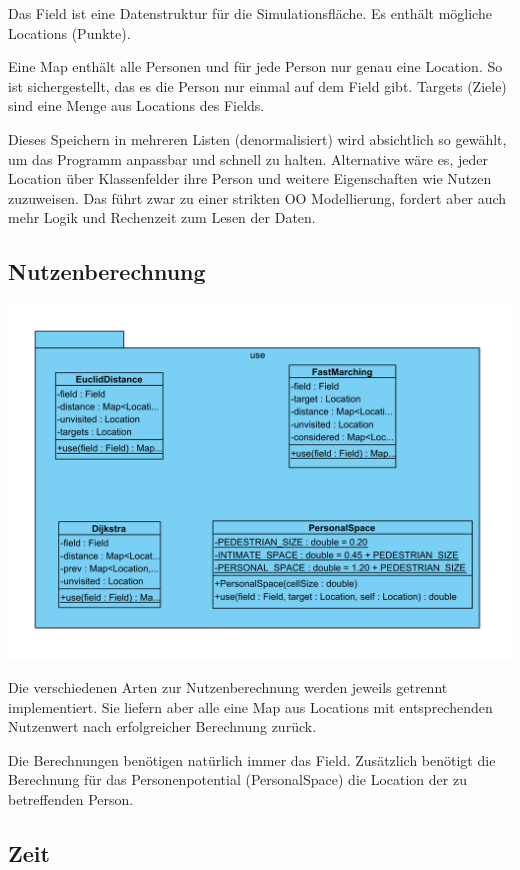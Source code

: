 Das Field ist eine Datenstruktur für die Simulationsfläche. Es enthält mögliche Locations (Punkte).

Eine Map enthält alle Personen und für jede Person nur genau eine Location. So ist sichergestellt, das es die Person nur einmal auf dem Field gibt. Targets (Ziele) sind eine Menge aus Locations des Fields.

Dieses Speichern in mehreren Listen (denormalisiert) wird absichtlich so gewählt, um das Programm anpassbar und schnell zu halten. Alternative wäre es, jeder Location über Klassenfelder ihre Person und weitere Eigenschaften wie Nutzen zuzuweisen. Das führt zwar zu einer strikten OO Modellierung, fordert aber auch mehr Logik und Rechenzeit zum Lesen der Daten.

\subsection{Nutzenberechnung}

\includegraphics[width=\textwidth]{abbildungen/uml/field-use}

Die verschiedenen Arten zur Nutzenberechnung werden jeweils getrennt implementiert. Sie liefern aber alle eine Map aus Locations mit entsprechenden Nutzenwert nach erfolgreicher Berechnung zurück.

Die Berechnungen benötigen natürlich immer das Field. Zusätzlich benötigt die Berechnung für das Personenpotential (PersonalSpace) die Location der zu betreffenden Person.

\subsection{Zeit}

